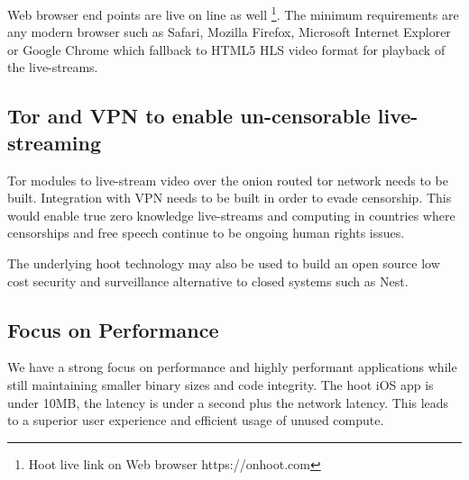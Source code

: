 \documentclass{article}
\begin{document}
Web browser end points are live on line as well
\footnote{Hoot live link on Web browser https://onhoot.com}. The minimum requirements are any modern
browser such as Safari, Mozilla Firefox, Microsoft Internet Explorer or Google Chrome which fallback to HTML5 HLS video format for playback of the live-streams.


\subsection{Tor and VPN to enable un-censorable live-streaming }
Tor modules to live-stream video over the onion routed tor network needs
to be built. Integration with VPN needs to be built in order to evade censorship. This would enable true zero knowledge live-streams and computing in
countries where censorships and free speech continue to be ongoing human rights issues.

The underlying hoot technology may also be used to build an open source low cost security and surveillance alternative to closed systems such as Nest.

\subsection{Focus on Performance}
We have a strong focus on performance and highly performant applications while still maintaining smaller binary sizes and code integrity. The hoot iOS app is under 10MB, the latency is under a second plus the network latency. This leads to a superior user experience and efficient usage of unused compute.

\end{document}
